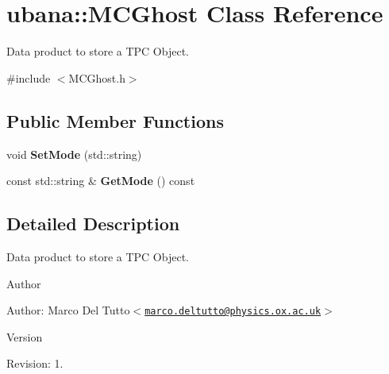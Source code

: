 \hypertarget{classubana_1_1MCGhost}{\section{ubana\-:\-:\-M\-C\-Ghost \-Class \-Reference}
\label{classubana_1_1MCGhost}
}


\-Data product to store a \-T\-P\-C \-Object.  




{\ttfamily \#include $<$\-M\-C\-Ghost.\-h$>$}

\subsection*{\-Public \-Member \-Functions}
\begin{DoxyCompactItemize}
\item 
\hypertarget{classubana_1_1MCGhost_ab78e269293fee8be5b8c6cca432d6d69}{void {\bfseries \-Set\-Mode} (std\-::string)}\label{classubana_1_1MCGhost_ab78e269293fee8be5b8c6cca432d6d69}

\item 
\hypertarget{classubana_1_1MCGhost_ae6b7f0a7adbf65eb38deb80b3f207f0b}{const std\-::string \& {\bfseries \-Get\-Mode} () const }\label{classubana_1_1MCGhost_ae6b7f0a7adbf65eb38deb80b3f207f0b}

\end{DoxyCompactItemize}


\subsection{\-Detailed \-Description}
\-Data product to store a \-T\-P\-C \-Object. 

\begin{DoxyAuthor}{\-Author}

\end{DoxyAuthor}
\begin{DoxyParagraph}{\-Author\-:}
\-Marco \-Del \-Tutto$<$\href{mailto:marco.deltutto@physics.ox.ac.uk}{\tt marco.\-deltutto@physics.\-ox.\-ac.\-uk}$>$ 
\end{DoxyParagraph}


\begin{DoxyVersion}{\-Version}

\end{DoxyVersion}
\begin{DoxyParagraph}{\-Revision\-:}
1. 
\end{DoxyParagraph}


